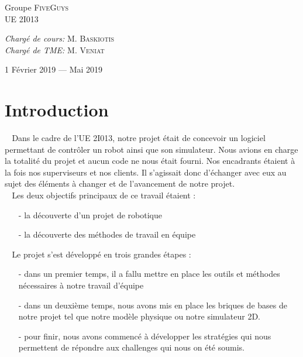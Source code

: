 \documentclass[12pt]{article}
\def\tab{$\>\>\>\>$}
\begin{document}
\begin{titlepage}
\begin{sffamily}
\begin{center}
    \begin{minipage}{0.4\textwidth}
      \begin{flushleft} \large
        Groupe \textsc{FiveGuys}\\
        UE 2I013\\
      \end{flushleft}
    \end{minipage}
    \begin{minipage}{0.4\textwidth}
      \begin{flushright} \large
        \emph{Chargé de cours:} M. \textsc{Baskiotis}\\
        \emph{Chargé de TME:} M. \textsc{Veniat}
      \end{flushright}
    \end{minipage}

    \vfill

    {\large 1\ier{} Février 2019 — Mai 2019}

  \end{center}
  \end{sffamily}
\end{titlepage}

\tableofcontents
\newpage
\section{Introduction}

\tab Dans le cadre de l'UE 2I013, notre projet était de concevoir un logiciel permettant de contrôler un robot ainsi que son simulateur. Nous avions en charge la totalité du projet et aucun code ne nous était fourni. Nos encadrants étaient à la fois nos superviseurs et nos clients. Il s'agissait donc d'échanger avec eux au sujet des éléments à changer et de l'avancement de notre projet.\\

\tab Les deux objectifs principaux de ce travail étaient : \begin{itemize}
\item[-] la découverte d'un projet de robotique
\item[-] la découverte des méthodes de travail en équipe
\item[]
\end{itemize}
\tab Le projet s'est développé en trois grandes étapes :\begin{itemize}
\item[-] dans un premier temps, il a fallu mettre en place les outils et méthodes nécessaires à notre travail d'équipe
\item[-] dans un deuxième temps, nous avons mis en place les briques de bases de notre projet tel que notre modèle physique ou notre simulateur 2D.
\item[-] pour finir, nous avons commencé à développer les stratégies qui nous permettent de répondre aux challenges qui nous on été soumis.
\end{itemize}
\end{document}
